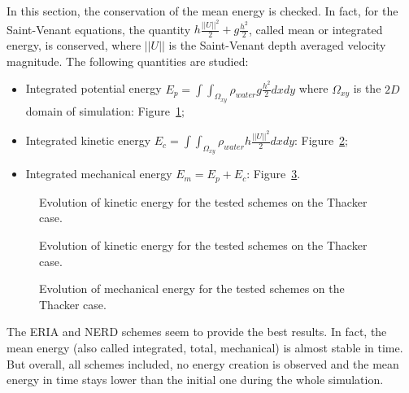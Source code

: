 In this section, the conservation of the mean energy is checked. In fact, for the Saint-Venant equations,
the quantity $h \frac{||U||^2}{2} + g \frac{h^2}{2}$, called mean or integrated energy, is conserved,
where $||U||$ is the Saint-Venant depth averaged velocity magnitude.
The following quantities are studied:
\begin{itemize}
\item Integrated potential energy \textbf{$E_p =\int\int_{\Omega_{xy}}\rho_{water} g \frac{h^2}{2} dxdy$} where $\Omega_{xy}$ is the $2D$ domain of simulation: Figure~\ref{fig:thacker:Ep};
\item Integrated kinetic energy \textbf{$E_c =\int\int_{\Omega_{xy}} \rho_{water} h \frac{||U||^2}{2} dxdy$}: Figure~\ref{fig:thacker:Ec};
\item Integrated mechanical energy \textbf{$E_m = E_p + E_c$}: Figure~\ref{fig:thacker:Em}.
\end{itemize}

\begin{figure}[H]
\centering
  \caption{Evolution of kinetic energy for the tested schemes on the Thacker case.}
\label{fig:thacker:Ep}
\end{figure}

\begin{figure}[H]
\centering
  \caption{Evolution of kinetic energy for the tested schemes on the Thacker case.}
\label{fig:thacker:Ec}
\end{figure}

\begin{figure}[H]
\centering
  \caption{Evolution of mechanical energy for the tested schemes on the Thacker case.}
\label{fig:thacker:Em}
\end{figure}

The ERIA and NERD schemes seem to provide the best results.
In fact, the mean energy (also called integrated, total, mechanical) is almost stable in time.
But overall, all schemes included, no energy creation is observed
and the mean energy in time stays lower than the initial one during the whole simulation.

